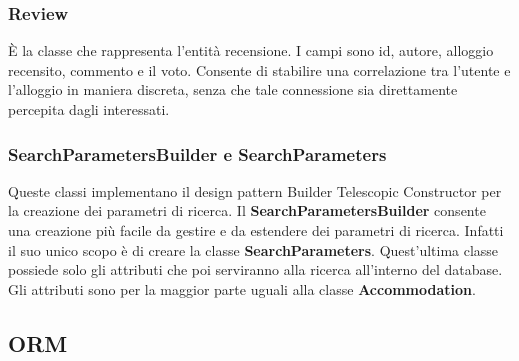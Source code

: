 \documentclass[10pt]{article}
\begin{document}
\subsubsection{Review}

\`E la classe che rappresenta l'entit\`a recensione. I campi sono id, autore, alloggio recensito, commento e il voto. Consente di stabilire una correlazione tra l'utente e l'alloggio in maniera discreta, senza che tale connessione sia direttamente percepita dagli interessati.

\subsubsection{SearchParametersBuilder e SearchParameters}

Queste classi implementano il design pattern Builder Telescopic Constructor per la creazione dei parametri di ricerca. Il \textbf{SearchParametersBuilder} consente una creazione pi\`u facile da gestire e da estendere dei parametri di ricerca. Infatti il suo unico scopo \`e di creare la classe \textbf{SearchParameters}. Quest'ultima classe possiede solo gli attributi che poi serviranno alla ricerca all'interno del database. Gli attributi sono per la maggior parte uguali alla classe \textbf{Accommodation}.

\subsection{ORM}
\end{document}
